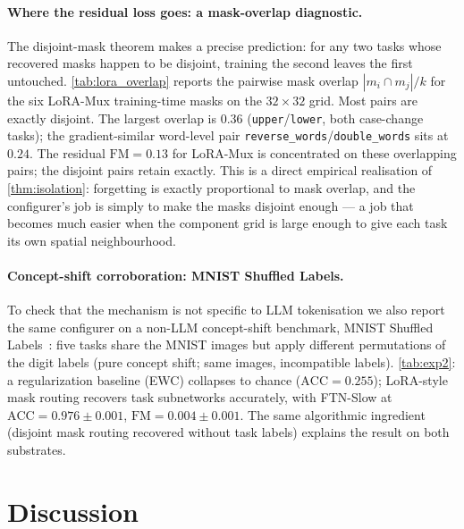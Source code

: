 \documentclass{article}
\theoremstyle{plain}
\theoremstyle{remark}
\begin{document}
\paragraph{Where the residual loss goes: a mask-overlap diagnostic.}
The disjoint-mask theorem makes a precise prediction: for any two tasks whose recovered masks happen to be disjoint, training the second leaves the first untouched. \cref{tab:lora_overlap} reports the pairwise mask overlap $|m_i\cap m_j|/k$ for the six LoRA-Mux training-time masks on the $32\times 32$ grid. Most pairs are exactly disjoint. The largest overlap is $0.36$ (\texttt{upper}/\texttt{lower}, both case-change tasks); the gradient-similar word-level pair \texttt{reverse\_words}/\texttt{double\_words} sits at $0.24$. The residual $\mathrm{FM}=0.13$ for LoRA-Mux is concentrated on these overlapping pairs; the disjoint pairs retain exactly. This is a direct empirical realisation of \cref{thm:isolation}: forgetting is exactly proportional to mask overlap, and the configurer's job is simply to make the masks disjoint enough — a job that becomes much easier when the component grid is large enough to give each task its own spatial neighbourhood.



\paragraph{Concept-shift corroboration: MNIST Shuffled Labels.}
To check that the mechanism is not specific to LLM tokenisation we also report the same configurer on a non-LLM concept-shift benchmark, MNIST Shuffled Labels~\citep{van2019three}: five tasks share the MNIST images but apply different permutations of the digit labels (pure concept shift; same images, incompatible labels). \cref{tab:exp2}: a regularization baseline (EWC) collapses to chance ($\mathrm{ACC}=0.255$); LoRA-style mask routing recovers task subnetworks accurately, with FTN-Slow at $\mathrm{ACC}=0.976\pm0.001$, $\mathrm{FM}=0.004\pm0.001$. The same algorithmic ingredient (disjoint mask routing recovered without task labels) explains the result on both substrates.



\section{Discussion}
\end{document}
